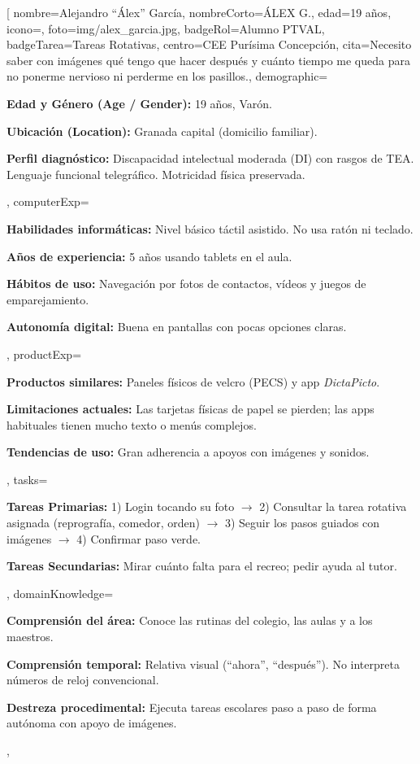 \documentclass[10pt]{article}
\begin{document}
\fichaAlumno[%
    nombre={Alejandro ``Álex'' García},
    nombreCorto={ÁLEX G.},
    edad={19 años},
    icono={\faUserGraduate},
    foto={img/alex_garcia.jpg},
    badgeRol={Alumno PTVAL},
    badgeTarea={Tareas Rotativas},
    centro={CEE Purísima Concepción},
    cita={Necesito saber con imágenes qué tengo que hacer después y cuánto tiempo me queda para no ponerme nervioso ni perderme en los pasillos.},
    demographic={%
        \item \textbf{Edad y Género (Age / Gender):} 19 años, Varón.
        \item \textbf{Ubicación (Location):} Granada capital (domicilio familiar).
        \item \textbf{Perfil diagnóstico:} Discapacidad intelectual moderada (DI) con rasgos de TEA. Lenguaje funcional telegráfico. Motricidad física preservada.
    },
    computerExp={%
        \item \textbf{Habilidades informáticas:} Nivel básico táctil asistido. No usa ratón ni teclado.
        \item \textbf{Años de experiencia:} 5 años usando tablets en el aula.
        \item \textbf{Hábitos de uso:} Navegación por fotos de contactos, vídeos y juegos de emparejamiento.
        \item \textbf{Autonomía digital:} Buena en pantallas con pocas opciones claras.
    },
    productExp={%
        \item \textbf{Productos similares:} Paneles físicos de velcro (PECS) y app \textit{DictaPicto}.
        \item \textbf{Limitaciones actuales:} Las tarjetas físicas de papel se pierden; las apps habituales tienen mucho texto o menús complejos.
        \item \textbf{Tendencias de uso:} Gran adherencia a apoyos con imágenes y sonidos.
    },
    tasks={%
        \item \textbf{Tareas Primarias:} 
        1) Login tocando su foto $\rightarrow$ 2) Consultar la tarea rotativa asignada (reprografía, comedor, orden) $\rightarrow$ 3) Seguir los pasos guiados con imágenes $\rightarrow$ 4) Confirmar paso verde.
        \item \textbf{Tareas Secundarias:} Mirar cuánto falta para el recreo; pedir ayuda al tutor.
    },
    domainKnowledge={%
        \item \textbf{Comprensión del área:} Conoce las rutinas del colegio, las aulas y a los maestros.
        \item \textbf{Comprensión temporal:} Relativa visual (``ahora'', ``después''). No interpreta números de reloj convencional.
        \item \textbf{Destreza procedimental:} Ejecuta tareas escolares paso a paso de forma autónoma con apoyo de imágenes.
    },
\end{document}
